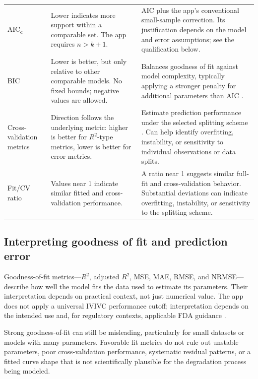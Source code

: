 \begin{longtable}{@{}>{\raggedright\arraybackslash}p{}>{\raggedright\arraybackslash}p{}>{\raggedright\arraybackslash}p{}@{}}
    AIC\textsubscript{c} & Lower indicates more support within a comparable set. The app requires $n>k+1$. & AIC plus the app's conventional small-sample correction. Its justification depends on the model and error assumptions; see the qualification below. \\
    BIC & Lower is better, but only relative to other comparable models. No fixed bounds; negative values are allowed. & Balances goodness of fit against model complexity, typically applying a stronger penalty for additional parameters than AIC \cite{schwarz1978,burnham2002,wagenmakers2004}. \\
    Cross-validation metrics & Direction follows the underlying metric: higher is better for \(R^2\)-type metrics, lower is better for error metrics. & Estimate prediction performance under the selected splitting scheme \cite{arlot2010, bergmeir2012, roberts2017, bergmeir2018}. Can help identify overfitting, instability, or sensitivity to individual observations or data splits. \\
    Fit/CV ratio & Values near 1 indicate similar fitted and cross-validation performance. & A ratio near 1 suggests similar full-fit and cross-validation behavior. Substantial deviations can indicate overfitting, instability, or sensitivity to the splitting scheme. \\
\bottomrule
\end{longtable}


\subsection{Interpreting goodness of fit and prediction error}

Goodness-of-fit metrics---\(R^2\), adjusted \(R^2\), MSE, MAE, RMSE, and NRMSE---describe how well the model fits the data used to estimate its parameters. Their interpretation depends on practical context, not just numerical value. The app does not apply a universal IVIVC performance cutoff; interpretation depends on the intended use and, for regulatory contexts, applicable FDA guidance \cite{fda_modeling_guidance,fda_reporting_guidance}.

Strong goodness-of-fit can still be misleading, particularly for small datasets or models with many parameters. Favorable fit metrics do not rule out unstable parameters, poor cross-validation performance, systematic residual patterns, or a fitted curve shape that is not scientifically plausible for the degradation process being modeled.

